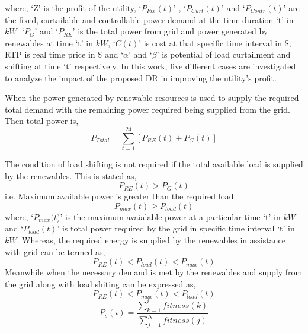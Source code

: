 where, `Z' is the profit of the utility, `$P_{Fix}(t)$' , `$P_{Curt}(t)$' and `$P_{Contr}(t)$' are the fixed, curtailable and controllable power demand at the time duration `t' in $kW$.
`$P_{G}$' and `$P_{RE}$' is the total power from grid and power generated by renewables at time `t' in $kW$, `$C(t)$' is cost at that specific time interval in $\$ $, RTP is real time price in $\$ $ and `$\alpha$' and `$\beta$' is potential of load curtailment and shifting at time `t' respectively. In this work, five different cases are investigated to analyze the impact of the proposed DR in improving the utility's profit. 
\par When the power generated by renewable resources is used to supply the required total demand with the remaining power required being supplied from the grid. Then total power is,
\begin{equation}
	P_{Total} =\sum_{t=1}^{24}[P_{RE}(t)+P_{G}(t)]
\end{equation}
\par The condition of load shifting is not required if the total available load is supplied by the renewables. This is stated as,
\begin{equation}
	P_{RE}(t)>P_{G}(t)
\end{equation}
i.e. Maximum  available power is greater than the required load. 
\begin{equation}
	P_{max}(t)\ge P_{load}(t)
\end{equation}                      
where, `$P_{max}(t$)' is the maximum avaialable power at a particular time `t' in $kW$ and `$P_{load}(t)$' is total power required by the grid in specific time interval `t' in $kW$. Whereas, the required energy is supplied by the renewables in assistance with grid can be termed as,
\begin{equation}
	P_{RE}(t) < P_{load}(t) < P_{max}(t)
\end{equation}       
Meanwhile when the necessary demand is met by the renewables and supply from the grid along with load shiting can be expressed as,
\begin{equation}
	P_{RE}(t) < P_{max}(t)< P_{load}(t) 
\end{equation}       
\begin{equation}						 {P_s(i)=\frac{\sum_{k=1}^{i}fitness (k)}{\sum_{j=1}^{N}fitness (j)}}
\end{equation}

